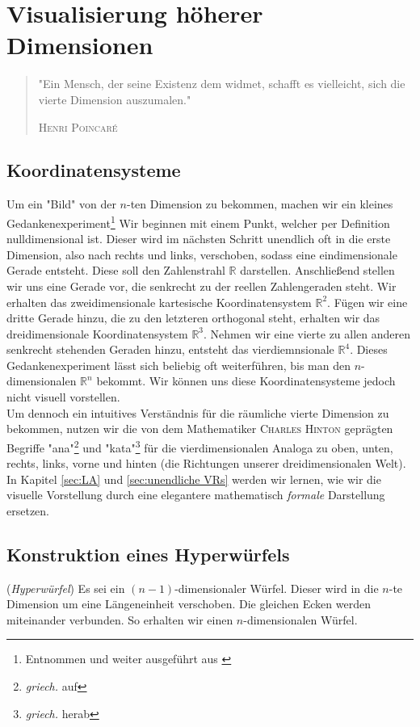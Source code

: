 \chapter{Visualisierung höherer Dimensionen}
\label{sec:Visualisierung}
\begin{quote}
"Ein Mensch, der seine Existenz dem widmet, schafft es vielleicht, sich die vierte Dimension auszumalen."
\begin{flushright}
\textsc{Henri Poincaré}
\end{flushright}
\end{quote}

\section{Koordinatensysteme}
\label{sec:KoS}
Um ein "Bild" von der $n$-ten Dimension zu bekommen, machen wir ein kleines Gedankenexperiment\footnote{Entnommen und weiter ausgeführt aus \cite[S. 71 f.]{Michio}} Wir beginnen mit einem Punkt, welcher per Definition nulldimensional ist. Dieser wird im nächsten Schritt unendlich oft in die erste Dimension, also nach rechts und links, verschoben, sodass eine eindimensionale Gerade entsteht. Diese soll den Zahlenstrahl $\mathbb{R}$ darstellen. Anschließend stellen wir uns eine Gerade vor, die senkrecht zu der reellen Zahlengeraden steht. Wir erhalten das zweidimensionale kartesische Koordinatensystem $\mathbb{R}^2$. Fügen wir eine dritte Gerade hinzu, die zu den letzteren orthogonal steht,  erhalten wir das dreidimensionale Koordinatensystem $\mathbb{R}^3$. 
Nehmen wir eine vierte zu allen anderen senkrecht stehenden Geraden hinzu, entsteht das vierdiemnsionale $\mathbb{R}^4$. Dieses Gedankenexperiment lässt sich beliebig oft weiterführen, bis man den $n$-dimensionalen $\mathbb{R}^n$ bekommt. Wir können uns diese Koordinatensysteme jedoch nicht visuell vorstellen.
\\ \indent Um dennoch ein intuitives Verständnis für die räumliche vierte Dimension zu bekommen, nutzen wir die von dem Mathematiker \textsc{Charles Hinton} geprägten Begriffe "ana"\footnote{\textit{griech.} auf} und "kata"\footnote{\textit{griech.} herab} für die vierdimensionalen Analoga zu oben, unten, rechts, links, vorne und hinten (die Richtungen unserer dreidimensionalen Welt). In Kapitel \ref{sec:LA} und \ref{sec:unendliche VRs} werden wir lernen, wie wir die visuelle Vorstellung durch eine elegantere mathematisch \emph{formale} Darstellung ersetzen.


\newpage
\section{Konstruktion eines Hyperwürfels}
\begin{definition} (\emph{Hyperwürfel}) Es sei ein $(n-1)$-dimensionaler Würfel. Dieser wird in die $n$-te Dimension um eine Längeneinheit verschoben. Die gleichen Ecken werden miteinander verbunden. So erhalten wir einen $n$-dimensionalen Würfel.
\end{definition}

